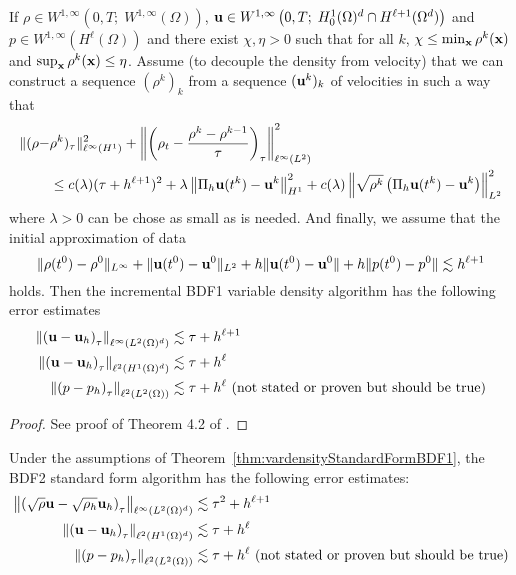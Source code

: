 \documentclass[letterpaper]{erdc}
\begin{document}
\begin{theorem}\label{thm:vardensityStandardFormBDF1}
If $\rho \in W^{1,\infty}\left(0,T; \; W^{1,\infty}(\Omega) \right)$, $\textbf{u} \in W^{1,\infty}\left(0,T;\; H^1_0(\Omega)^d\cap H^{\ell+1}(\Omega^d) \right)$ and $p\in W^{1,\infty}\left( H^{\ell}(\Omega)\right)$ and there exist $\chi, \eta >0 $ such that for all $k$, $\chi \leq \min_{\textbf{x}} \rho^k(\textbf{x})$ and $\sup_{\textbf{x}} \rho^k(\textbf{x}) \leq \eta$. Assume (to decouple the density from velocity) that we can construct a sequence $(\rho^k)_k$ from a sequence $(\textbf{u}^k)_k$ of velocities in such a way that
\begin{align}
  \|(\rho - &\rho^k)_{\tau}\|^2_{\ell^{\infty}(H^1)} + \left\| \left( \rho_t - \frac{\rho^k - \rho^{k-1}}{\tau} \right)_{\tau} \right\|^2_{\ell^{\infty}(L^2)}\\
  &\leq c(\lambda)(\tau + h^{\ell+1})^2 + \lambda \left\| \Pi_h\textbf{u}(t^k) - \textbf{u}^k  \right\|^2_{H^1} + c(\lambda)\left\|\sqrt{\rho^k} \left(\Pi_h\textbf{u}(t^k) - \textbf{u}^k\right)\right\|^2_{L^2}
  \end{align}
  where $\lambda>0$ can be chose as small as is needed. And finally, we assume that the initial approximation of data 
  \begin{equation}
    \|\rho(t^0) - \rho^0\|_{L^{\infty}} + \|\textbf{u}(t^0)-\textbf{u}^{0}\|_{L^2} + h\|\textbf{u}(t^0) - \textbf{u}^0\| + h\|p(t^0) - p^0\| \lesssim h^{\ell+1}
  \end{equation}
  holds.  Then the incremental BDF1 variable density algorithm has the following error estimates
  \begin{align}
    \left\|\left(\textbf{u} - \textbf{u}_h\right)_{\tau}\right\|_{\ell^{\infty}(L^2(\Omega)^d)} &\lesssim \tau + h^{\ell+1}\\
    \left\|\left(\textbf{u} - \textbf{u}_h\right)_{\tau}\right\|_{\ell^{2}(H^1(\Omega)^d)} &\lesssim \tau + h^{\ell}\\
    \left\|\left(p - p_h\right)_{\tau}\right\|_{\ell^{2}(L^2(\Omega))} & \lesssim \tau + h^{\ell}  \mbox{  (not stated or proven but should be true)}
  \end{align}
\end{theorem}
\begin{proof}
  See proof of Theorem 4.2 of \cite{guermond2011error}.
\end{proof}

\begin{conjecture}
  Under the assumptions of Theorem~\ref{thm:vardensityStandardFormBDF1}, the BDF2 standard form algorithm has the following error estimates:
  \begin{align}
    \left\| \left(\sqrt{\rho} \textbf{u} - \sqrt{\rho_h} \textbf{u}_h \right)_{\tau} \right\|_{\ell^{\infty}(L^2(\Omega)^d)} &\lesssim \tau^2 + h^{\ell+1}\\
    \left\| \left(\textbf{u} - \textbf{u}_h \right)_{\tau} \right\|_{\ell^2(H^1(\Omega)^d)} &\lesssim \tau + h^{\ell}\\
    \left\|\left(p - p_h\right)_{\tau} \right\|_{\ell^{2}(L^2(\Omega))} &\lesssim \tau + h^{\ell}  \mbox{  (not stated or proven but should be true)}
  \end{align}
\end{conjecture}
\end{document}
